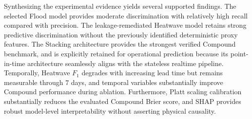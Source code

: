 Synthesizing the experimental evidence yields several supported findings. The selected Flood model provides moderate discrimination with relatively high recall compared with precision. The leakage-remediated Heatwave model retains strong predictive discrimination without the previously identified deterministic proxy features. The Stacking architecture provides the strongest verified Compound benchmark, and is explicitly retained for operational prediction because its point-in-time architecture seamlessly aligns with the stateless realtime pipeline. Temporally, Heatwave $F_1$ degrades with increasing lead time but remains measurable through 7 days, and temporal variables substantially improve Compound performance during ablation. Furthermore, Platt scaling calibration substantially reduces the evaluated Compound Brier score, and SHAP provides robust model-level interpretability without asserting physical causality.
